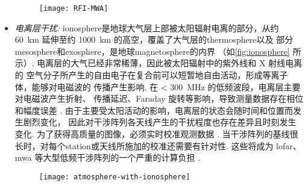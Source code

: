 \begin{itemize}
\begin{figure}[tbp]
  \centering
  \texttt{[image: RFI-MWA]}
  \label{fig:rfi-mwa}
\end{figure}

\item
\emph{电离层干扰:}
\acf{ionosphere}是地球大气层上部被太阳辐射电离的部分，从约 \SI{60}{\km}
延伸至约 \SI{1000}{\km} 的高空，覆盖了大气层的\ac{thermosphere}以及
部分\ac{mesosphere}和\ac{exosphere}，是地球\ac{magnetosphere}的内界
（如\autoref{fig:ionosphere} 所示）.
电离层的大气已经非常稀薄，因此被太阳辐射中的紫外线和 X 射线电离的
空气分子所产生的自由电子在复合前可以短暂地自由活动，形成等离子体，能够对电磁波的
传播产生影响.
在 \SI{< 300}{\MHz} 的低频波段，电离层主要对电磁波产生折射、
传播延迟、Faraday 旋转等影响，导致测量数据存在相位和幅度误差
\cite{intema2009,thompson2017}.
由于主要受太阳活动的影响，电离层的状态会随时间和位置而发生剧烈变化，
因此对干涉阵列各天线产生的干扰程度也存在差异且时刻发生变化.
为了获得高质量的图像，必须实时校准观测数据 \cite{intema2009,jordan2017}.
当干涉阵列的基线很长时，对每个\ac{station}或天线所施加的校准还需要有针对性.
这些将成为 \ac{lofar}、\ac{mwa} 等大型低频干涉阵列的一个严重的计算负担
\cite{intema2009,deGasperin2018}.

\begin{figure}[tbp]
  \centering
  \texttt{[image: atmosphere-with-ionosphere]}
  \label{fig:ionosphere}
\end{figure}


\end{itemize}
